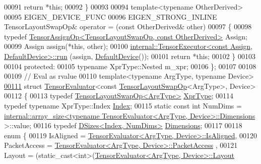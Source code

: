 \begin{DoxyCode}
00091       \textcolor{keywordflow}{return} *\textcolor{keyword}{this};
00092     \}
00093 
00094     \textcolor{keyword}{template}<\textcolor{keyword}{typename} OtherDerived>
00095     EIGEN\_DEVICE\_FUNC
00096     EIGEN\_STRONG\_INLINE TensorLayoutSwapOp& operator = (\textcolor{keyword}{const} OtherDerived& other)
00097     \{
00098       \textcolor{keyword}{typedef} \hyperlink{class_eigen_1_1_tensor_assign_op}{TensorAssignOp<TensorLayoutSwapOp, const OtherDerived>}
       Assign;
00099       Assign assign(*\textcolor{keyword}{this}, other);
00100       \hyperlink{class_eigen_1_1internal_1_1_tensor_executor}{internal::TensorExecutor<const Assign, DefaultDevice>::run}
      (assign, \hyperlink{struct_eigen_1_1_default_device}{DefaultDevice}());
00101       \textcolor{keywordflow}{return} *\textcolor{keyword}{this};
00102     \}
00103 
00104   \textcolor{keyword}{protected}:
00105     \textcolor{keyword}{typename} XprType::Nested m\_xpr;
00106 \};
00107 
00108 
00109 \textcolor{comment}{// Eval as rvalue}
00110 \textcolor{keyword}{template}<\textcolor{keyword}{typename} ArgType, \textcolor{keyword}{typename} Device>
\hyperlink{struct_eigen_1_1_tensor_evaluator_3_01const_01_tensor_layout_swap_op_3_01_arg_type_01_4_00_01_device_01_4}{00111} \textcolor{keyword}{struct }\hyperlink{struct_eigen_1_1_tensor_evaluator}{TensorEvaluator}<const \hyperlink{class_eigen_1_1_tensor_layout_swap_op}{TensorLayoutSwapOp}<ArgType>, Device>
00112 \{
00113   \textcolor{keyword}{typedef} \hyperlink{class_eigen_1_1_tensor_layout_swap_op}{TensorLayoutSwapOp<ArgType>} \hyperlink{class_eigen_1_1_tensor_layout_swap_op}{XprType};
00114   \textcolor{keyword}{typedef} \textcolor{keyword}{typename} XprType::Index \hyperlink{namespace_eigen_a62e77e0933482dafde8fe197d9a2cfde}{Index};
00115   \textcolor{keyword}{static} \textcolor{keyword}{const} \textcolor{keywordtype}{int} NumDims = 
      \hyperlink{struct_eigen_1_1internal_1_1array__size}{internal::array\_size<typename TensorEvaluator<ArgType, Device>::Dimensions}
      >::value;
00116   \textcolor{keyword}{typedef} \hyperlink{struct_eigen_1_1_d_sizes}{DSizes<Index, NumDims>} \hyperlink{struct_eigen_1_1_d_sizes}{Dimensions};
00117 
00118   \textcolor{keyword}{enum} \{
00119     IsAligned = \hyperlink{struct_eigen_1_1_tensor_evaluator}{TensorEvaluator<ArgType, Device>::IsAligned},
00120     PacketAccess = \hyperlink{struct_eigen_1_1_tensor_evaluator}{TensorEvaluator<ArgType, Device>::PacketAccess}
      ,
00121     Layout = (\textcolor{keyword}{static\_cast<}\textcolor{keywordtype}{int}\textcolor{keyword}{>}(\hyperlink{struct_eigen_1_1_tensor_evaluator}{TensorEvaluator<ArgType, Device>::Layout}

\end{DoxyCode}

